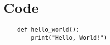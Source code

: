 \section{Code}
\begin{lstlisting}
    def hello_world():
        print("Hello, World!")
\end{lstlisting}
